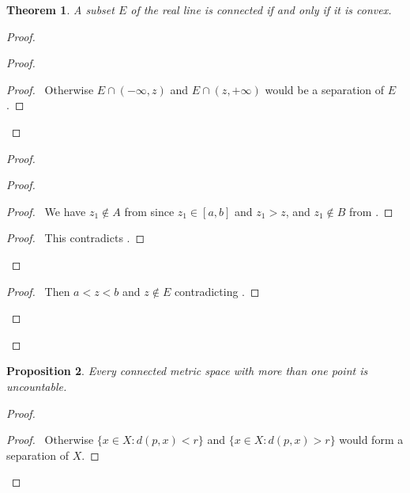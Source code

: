 \documentclass{book}
\let\qed\relax
\newtheorem{prop}{Proposition}[chapter]
\newtheorem{thm}[prop]{Theorem}
\theoremstyle{definition}
\begin{document}
\begin{thm}
A subset $E$ of the real line is connected if and only if it is convex.
\end{thm}

\begin{proof}
\pf
{}
\begin{proof}
	\begin{proof}
		\pf\ Otherwise $E \cap (-\infty, z)$ and $E \cap (z, + \infty)$ would be a separation of $E$.
	\end{proof}
\end{proof}
\begin{proof}
	\begin{proof}
		\begin{proof}
			\pf\ We have $z_1 \notin A$ from  since $z_1 \in [a,b]$ and $z_1 > z$, and $z_1 \notin B$ from .
		\end{proof}
		\qedstep
		\begin{proof}
			\pf\ This contradicts .
		\end{proof}
	\end{proof}
	\begin{proof}
		\pf\ Then $a < z < b$ and $z \notin E$ contradicting .
	\end{proof}
\end{proof}
\qed
\end{proof}

\begin{prop}
Every connected metric space with more than one point is uncountable.
\end{prop}

\begin{proof}
\pf
{}
\begin{proof}
	\pf\ Otherwise $\{ x \in X : d(p,x) < r \}$ and $\{ x \in X : d(p,x) > r \}$ would form a separation of $X$.
\end{proof}
\qed
\end{proof}
\end{document}
